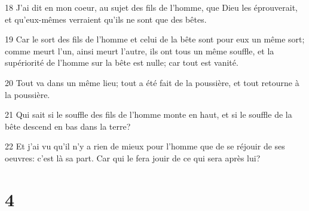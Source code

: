 \par 18 J'ai dit en mon coeur, au sujet des fils de l'homme, que Dieu les éprouverait, et qu'eux-mêmes verraient qu'ils ne sont que des bêtes.
\par 19 Car le sort des fils de l'homme et celui de la bête sont pour eux un même sort; comme meurt l'un, ainsi meurt l'autre, ils ont tous un même souffle, et la supériorité de l'homme sur la bête est nulle; car tout est vanité.
\par 20 Tout va dans un même lieu; tout a été fait de la poussière, et tout retourne à la poussière.
\par 21 Qui sait si le souffle des fils de l'homme monte en haut, et si le souffle de la bête descend en bas dans la terre?
\par 22 Et j'ai vu qu'il n'y a rien de mieux pour l'homme que de se réjouir de ses oeuvres: c'est là sa part. Car qui le fera jouir de ce qui sera après lui?

\chapter{4}

